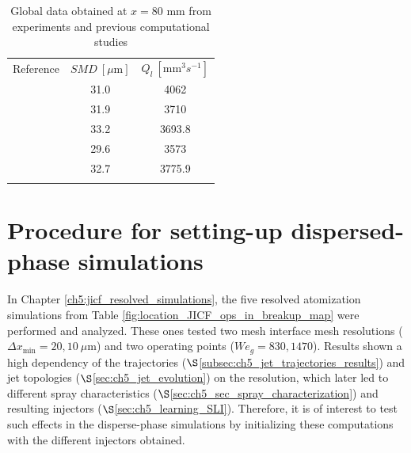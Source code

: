 \begin{table}[!h]
\centering
\caption{Global data obtained at $x = 80$ mm from experiments and previous computational studies }
\begin{tabular}{ccc}
\thickhline
Reference & $SMD~\left[ \mu \mathrm{m}\right]$  & $Q_l~\left[ \mathrm{mm}^3 s^{-1} \right]$ \\
\thickhline
{} & 31.0 &   4062  \\  
 & 31.9  & 3710  \\
 & 33.2 &  3693.8  \\
 & 29.6  & 3573  \\
 & 32.7  & 3775.9  \\
\thickhline
\end{tabular}
\label{tab:previous_numerical_studies_on_jicf_dlr_values}
\end{table}




\clearpage



\section{Procedure for setting-up dispersed-phase simulations}

In Chapter \ref{ch5:jicf_resolved_simulations}, the five resolved atomization simulations from Table \ref{fig:location_JICF_ops_in_breakup_map} were performed and analyzed. These ones tested two mesh interface mesh resolutions ($\Delta x_\mathrm{min} = 20, 10~\mu$m) and two operating points ($We_g = 830, 1470$). Results shown a high dependency of the trajectories ($\S$\ref{subsec:ch5_jet_trajectories_results}) and jet topologies ($\S$\ref{sec:ch5_jet_evolution}) on the resolution, which later led to different spray characteristics ($\S$\ref{sec:ch5_sec_spray_characterization}) and resulting injectors ($\S$\ref{sec:ch5_learning_SLI}). Therefore, it is of interest to test such effects in the disperse-phase simulations by initializing these computations with the different injectors obtained.

